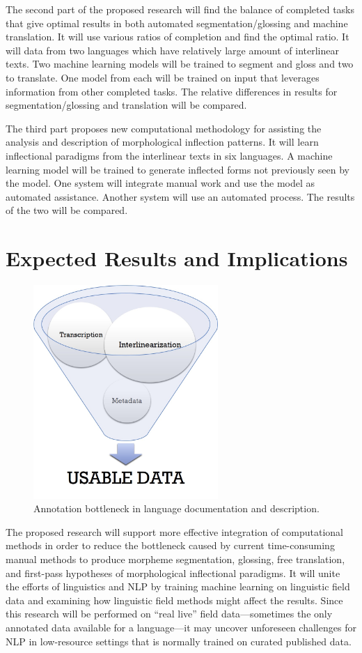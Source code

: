 The second part of the proposed research will find the balance of completed tasks that give optimal results in both automated segmentation/glossing and machine translation. It will use various ratios of completion and find the optimal ratio. It will data from two languages which have relatively large amount of interlinear texts. Two machine learning models will be trained to segment and gloss and two to translate. One model from each will be trained on input that leverages information from other completed tasks. The relative differences in results for segmentation/glossing and translation will be compared.

The third part proposes new computational methodology for assisting the analysis and description of morphological inflection patterns. It will learn inflectional paradigms from the interlinear texts in six languages. A machine learning model will be trained to generate inflected forms not previously seen by the model. One system will integrate manual work and use the model as automated assistance. Another system will use an automated process. The results of the two will be compared.

\section{Expected Results and Implications}

\begin{figure}[h!]
    \centering
    \includegraphics[width=7cm]{figs/AnnotationFunnel.jpg}
    \caption[Annotation Bottleneck]{Annotation bottleneck in language documentation and description.}
    \label{fig:bottleneck}
\end{figure}


The proposed research will support more effective integration of computational methods in order to reduce the bottleneck caused by current time-consuming manual methods to produce morpheme segmentation, glossing, free translation, and first-pass hypotheses of morphological inflectional paradigms. It will unite the efforts of linguistics and NLP by training machine learning on linguistic field data and examining how linguistic field methods might affect the results. Since this research will be performed on “real live” field data---sometimes the only annotated data available for a language---it may uncover unforeseen challenges for NLP in low-resource settings that is normally trained on curated published data. 

